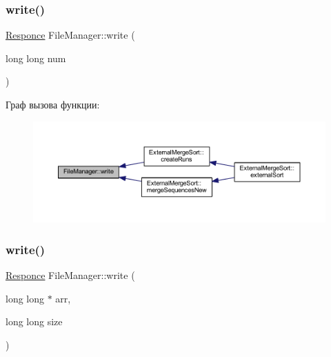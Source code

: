 \hypertarget{class_file_manager_a77cb9ec2885923dd6b7a9674cb75f85f}{}\label{class_file_manager_a77cb9ec2885923dd6b7a9674cb75f85f} 
\subsubsection{\texorpdfstring{write()}{write()}\hspace{0.1cm}{\footnotesize\ttfamily [1/2]}}
{\footnotesize\ttfamily \hyperlink{_structures_8h_a9864d6ef28dd6e38416afac4426b3491}{Responce} File\+Manager\+::write (\begin{DoxyParamCaption}\item[{long long}]{num }\end{DoxyParamCaption})}

Граф вызова функции\+:\nopagebreak
\begin{figure}[H]
\begin{center}
\leavevmode
\includegraphics[width=350pt]{class_file_manager_a77cb9ec2885923dd6b7a9674cb75f85f_icgraph}
\end{center}
\end{figure}
\hypertarget{class_file_manager_ad4c96727180b0055942d20b7b5bfe5f8}{}\label{class_file_manager_ad4c96727180b0055942d20b7b5bfe5f8} 
\subsubsection{\texorpdfstring{write()}{write()}\hspace{0.1cm}{\footnotesize\ttfamily [2/2]}}
{\footnotesize\ttfamily \hyperlink{_structures_8h_a9864d6ef28dd6e38416afac4426b3491}{Responce} File\+Manager\+::write (\begin{DoxyParamCaption}\item[{long long $\ast$}]{arr,  }\item[{long long}]{size }\end{DoxyParamCaption})}




